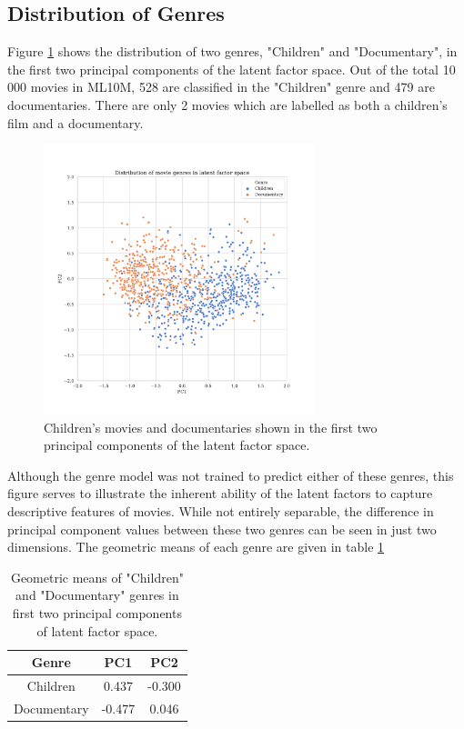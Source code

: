 \subsection{Distribution of Genres}
Figure \ref{fig:5-genre-pca} shows the distribution of two genres, "Children" and "Documentary", in the first two principal components of the latent factor space. Out of the total 10 000 movies in ML10M, 528 are classified in the "Children" genre and 479 are documentaries. There are only 2 movies which are labelled as both a children's film and a documentary.

\begin{figure}[H]
\centering
\includegraphics[width=0.7\textwidth]{Figures/5_ml10m-genre-pca.pdf}
\decoRule
\caption[Distribution of genres in latent factor space]{Children's movies and documentaries shown in the first two principal components of the latent factor space.}
\label{fig:5-genre-pca}
\end{figure}

Although the genre model was not trained to predict either of these genres, this figure serves to illustrate the inherent ability of the latent factors to capture descriptive features of movies. While not entirely separable, the difference in principal component values between these two genres can be seen in just two dimensions. The geometric means of each genre are given in table \ref{tab:ml10m-genre-pca}

\begin{table}[H]
\centering
\begin{tabular}{c | c | c}
\toprule
\textbf{Genre} & \textbf{PC1} & \textbf{PC2} \\
\midrule
Children & 0.437 & -0.300 \\
\midrule
Documentary & -0.477 & 0.046 \\
\bottomrule
\end{tabular}
\caption[Genre principal component means]{Geometric means of "Children" and "Documentary" genres in first two principal components of latent factor space.}
\label{tab:ml10m-genre-pca}
\end{table}

